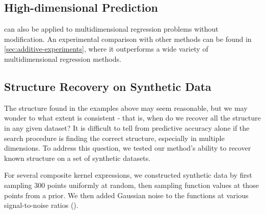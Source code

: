 




\subsection{High-dimensional Prediction}

\procedurename{} can also be applied to multidimensional regression problems without modification.
An experimental comparison with other methods can be found in \cref{sec:additive-experiments}, where it outperforms a wide variety of multidimensional regression methods.



\subsection{Structure Recovery on Synthetic Data}
\label{sec:synthetic}

The structure found in the examples above may seem reasonable, but we may wonder to what extent \procedurename{} is consistent - that is, when do we recover all the structure in any given dataset?
It is difficult to tell from predictive accuracy alone if the search procedure is finding the correct structure, especially in multiple dimensions.
To address this question, we tested our method's ability to recover known structure on a set of synthetic datasets.

For several composite kernel expressions, we constructed synthetic data by first sampling 300 points uniformly at random, then sampling function values at those points from a \gp{} prior.
We then added \iid Gaussian noise to the functions at various signal-to-noise ratios (\SNR{}).


